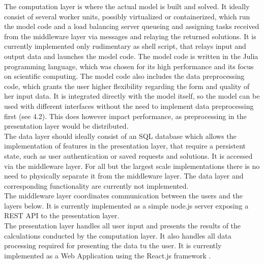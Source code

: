 \documentclass[
	11pt,								%
	DIV10,								%
	a4paper,         					%
	oneside,							%
	headheight=20pt,					%
	footheight=20pt,					%
    parskip=full,						%
    listof=totoc,						%
	bibliography=totoc,					%
	index=totoc,						%
]{scrartcl}
\begin{document}
The computation layer is where the actual model is built and solved. It ideally consist of several worker units, possibly virtualized or containerized, which run the model code and a load balancing server queueing and assigning tasks received from the middleware layer via messages and relaying the returned solutions. It is currently implemented only rudimentary as shell script, that relays input and output data and launches the model code. The model code is written in the Julia programming language, which was chosen for its high performance  and its focus on scientific computing. The model code also includes the data preprocessing code, which grants the user higher flexibility regarding the form and quality of her input data. It is integrated directly with the model itself, so the model can be used with different interfaces without the need to implement data preprocessing first (see 4.2). This does however impact performance, as preprocessing in the presentation layer would be distributed. \\
The data layer should ideally consist of an SQL database which allows the implementation of features in the presentation layer, that require a persistent state, such as user authentication or saved requests and solutions. It is accessed via the middleware layer. For all but the largest scale implementations there is no need to physically separate it from the middleware layer. The data layer and corresponding functionality are currently not implemented.
\\
The middleware layer coordinates communication between the users and the layers below. It is currently implemented as a simple node.js server  exposing a REST API  to the presentation layer.
\\
The presentation layer handles all user input and presents the results of the calculations conducted by the computation layer. It also handles all data processing required for presenting the data tu the user.  It is currently implemented as a Web Application using the React.js framework  . 
\end{document}
